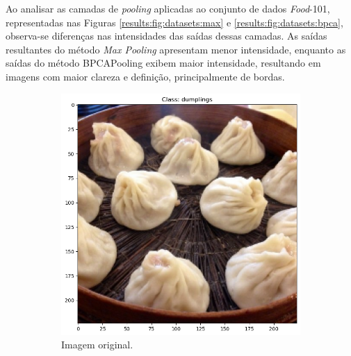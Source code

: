 Ao analisar as camadas de \textit{pooling} aplicadas ao conjunto de dados \textit{Food}-101, representadas nas Figuras \ref{results:fig:datasets:max} e \ref{results:fig:datasets:bpca}, observa-se diferenças nas intensidades das saídas dessas camadas. As saídas resultantes do método \textit{Max Pooling} apresentam menor intensidade, enquanto as saídas do método BPCAPooling exibem maior intensidade, resultando em imagens com maior clareza e definição, principalmente de bordas.

\begin{figure}[p]
    \caption[Visualização de camadas de \textit{Max Pooling} - \textit{Food}-101]{Resultado visual de camadas de \textit{pooling} do conjunto \textit{Food}-101. Camadas com \textit{Max Pooling}.}
    \centering
    \label{results:fig:datasets:max}
     \begin{subfigure}[t]{0.45\textwidth}
         \centering
         \includegraphics[width=1\linewidth]{recursos/imagens/results/original.png}
         \caption{Imagem original.}
         \label{results:fig:datasets:max_original}
     \end{subfigure}%
     ~ 
     \begin{subfigure}[t]{0.45\textwidth}
         \centering

\end{subfigure}
\end{figure}
